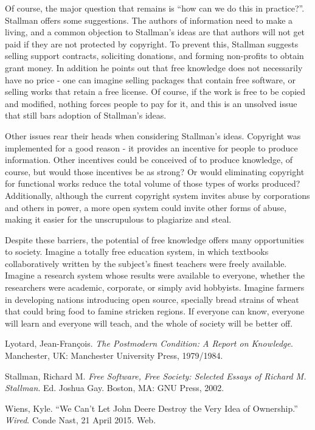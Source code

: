 \documentclass[titlepage]{article}
\begin{document}
Of course, the major question that remains is ``how can we do this in
practice?''. Stallman offers some suggestions. The authors of
information need to make a living, and a common objection to Stallman's
ideas are that authors will not get paid if they are not protected by
copyright. To prevent this, Stallman suggests selling support contracts,
soliciting donations, and forming non-profits to obtain grant money. In
addition he points out that free knowledge does not necessarily have no
price - one can imagine selling packages that contain free software, or
selling works that retain a free license. Of course, if the work is free
to be copied and modified, nothing forces people to pay for it, and this
is an unsolved issue that still bars adoption of Stallman's ideas.

Other issues rear their heads when considering Stallman's ideas.
Copyright was implemented for a good reason - it provides an incentive
for people to produce information. Other incentives could be conceived
of to produce knowledge, of course, but would those incentives be as
strong? Or would eliminating copyright for functional works reduce the
total volume of those types of works produced? Additionally, although
the current copyright system invites abuse by corporations and others in
power, a more open system could invite other forms of abuse, making it
easier for the unscrupulous to plagiarize and steal.

Despite these barriers, the potential of free knowledge offers many
opportunities to society. Imagine a totally free education system, in
which textbooks collaboratively written by the subject's finest teachers
were freely available. Imagine a research system whose results were
available to everyone, whether the researchers were academic, corporate,
or simply avid hobbyists. Imagine farmers in developing nations
introducing open source, specially bread strains of wheat that could
bring food to famine stricken regions. If everyone can know, everyone
will learn and everyone will teach, and the whole of society will be
better off.

\begin{thebibliography}{9}

Lyotard, Jean-François.
\emph{The Postmodern Condition: A Report on Knowledge}.
Manchester, UK: Manchester University Press,
1979/1984.

Stallman, Richard M.
\emph{Free Software, Free Society: Selected Essays of Richard M. Stallman}.
Ed. Joshua Gay.
Boston, MA: GNU Press, 2002.

Wiens, Kyle.
``We Can't Let John Deere Destroy the Very Idea of Ownership.''
\emph{Wired}.
Conde Nast, 21 April 2015.
Web.

\end{thebibliography}
\end{document}

